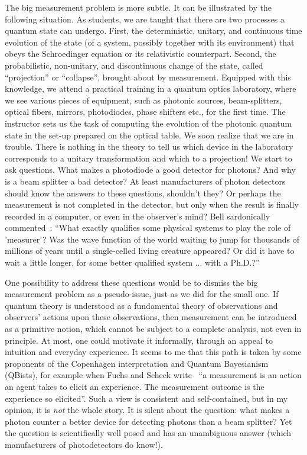 \documentclass[12pt,a4]{article}
\begin{document}
The big measurement problem is more subtle. It can be illustrated by the following situation. As students, we are taught that there are two processes a quantum state can undergo. First, the deterministic, unitary, and continuous time evolution of the state (of a system, possibly together with its environment) that obeys the Schroedinger equation or its relativistic counterpart. Second, the probabilistic, non-unitary, and discontinuous change of the state, called ``projection'' or ``collapse'', brought about by measurement. Equipped with this knowledge, we attend a practical training in a quantum optics laboratory, where we see various pieces of equipment, such as photonic sources, beam-splitters, optical fibers, mirrors, photodiodes, phase shifters etc., for the first time. The instructor sets us the task of computing the evolution of the photonic quantum state in the set-up prepared on the optical table. We soon realize that we are in trouble. There is nothing in the theory to tell us which device in the laboratory corresponds to a unitary transformation and which to a projection! We start to ask questions. What makes a photodiode a good detector for photons? And why is a beam splitter a bad detector? At least manufacturers of photon detectors should know the answers to these questions, shouldn't they? Or perhaps the measurement is not completed in the detector, but only when the result is finally recorded in a computer, or even in the observer's mind? Bell sardonically commented~\cite{bell}: ``What exactly qualifies some physical systems to play the role of 'measurer'? Was the wave function of the world waiting to jump for thousands of millions of years until a single-celled living creature appeared? Or did it have to wait a little longer, for some better qualified system ... with a Ph.D.?'' 

One possibility to address these questions would be to dismiss the big measurement problem as a pseudo-issue, just as we did for the small one. If quantum theory is understood as a fundamental theory of observations and observers' actions upon these observations, then measurement can be introduced as a primitive notion, which cannot be subject to a complete  analysis, not even in principle. At most, one could motivate it informally, through an appeal to intuition and everyday experience. It seems to me that this path is taken by some proponents of the Copenhagen interpretation and Quantum Bayesianism (QBists), for example when Fuchs and Scheck write~\cite{fuchs} ``a measurement is an action an agent takes to elicit an experience. The measurement outcome is the experience so elicited''. Such a view is consistent and self-contained, but in my opinion, it is {\it not} the whole story. It is silent about the question: what makes a photon counter a better device for detecting photons than a beam splitter? Yet the question is scientifically well posed and has an unambiguous answer (which manufacturers of photodetectors do know!).  
\end{document}
